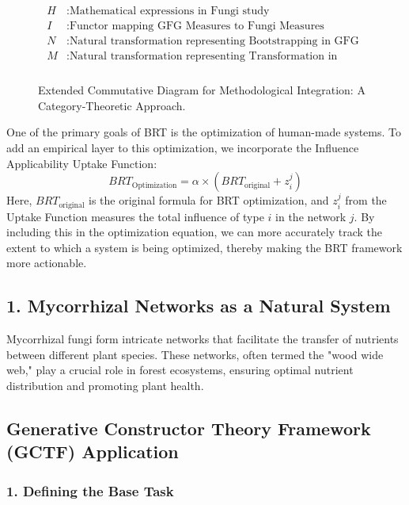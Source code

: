 \documentclass[sn-nature]{sn-jnl}%
\theoremstyle{thmstyleone}%
\theoremstyle{thmstyletwo}%
\theoremstyle{thmstylethree}%
\begin{document}
\begin{enumerate}
\begin{figure}[H]
\begin{align*}
{\begin{aligned}
H & : \text{Mathematical expressions in Fungi study} \\
I & : \text{Functor mapping GFG Measures to Fungi Measures} \\
N & : \text{Natural transformation representing Bootstrapping in GFG} \\
M & : \text{Natural transformation representing Transformation in Fungi} \\
\end{aligned}
}
\end{align*}
\caption{Extended Commutative Diagram for Methodological Integration: A Category-Theoretic Approach.}
\label{fig:extended_commutative_diagram}
\end{figure}


One of the primary goals of BRT is the optimization of human-made systems. To add an empirical layer to this optimization, we incorporate the Influence Applicability Uptake Function:
\begin{equation}
BRT_{\text{Optimization}} = \alpha \times (BRT_{\text{original}} + z_i^j)
\end{equation}
Here, \( BRT_{\text{original}} \) is the original formula for BRT optimization, and \( z_i^j \) from the Uptake Function measures the total influence of type \( i \) in the network \( j \). By including this in the optimization equation, we can more accurately track the extent to which a system is being optimized, thereby making the BRT framework more actionable.
\subsection*{1. Mycorrhizal Networks as a Natural System}

Mycorrhizal fungi form intricate networks that facilitate the transfer of nutrients between different plant species. These networks, often termed the "wood wide web," play a crucial role in forest ecosystems, ensuring optimal nutrient distribution and promoting plant health\cite{whiteside_data_2019}.

\subsection*{Generative Constructor Theory Framework (GCTF) Application}

\subsubsection*{1. Defining the Base Task}


\end{enumerate}
\end{document}
